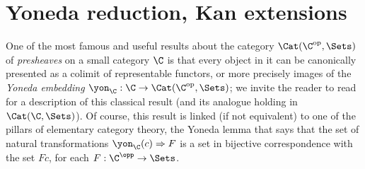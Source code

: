 \section{Yoneda reduction, Kan extensions}\label{sec:tre}
One of the most famous and useful results about the category $\Cat(\C^\text{op}, \Sets)$ of \emph{presheaves} on a small category $\C$ is that every object in it can be canonically presented as a colimit of representable functors, or more precisely images of the \emph{Yoneda embedding} $\yon_\C : \C \to \Cat(\C^\text{op}, \Sets)$; we invite the reader to read \cite[Theorem \textbf{III.7.1}]{McL} for a description of this classical result (and its analogue holding in $\Cat(\C, \Sets)$). Of course, this result is linked (if not equivalent) to one of the pillars of elementary category theory, the Yoneda lemma that says that the set of natural transformations $\yon_\C(c)\Rightarrow F$ is a set in bijective correspondence with the set $Fc$, for each $F : \C^\opp\to \Sets$.

